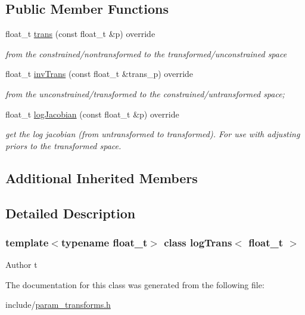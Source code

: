 \subsection*{Public Member Functions}
\begin{DoxyCompactItemize}
\item 
\mbox{\label{classlogTrans_af83380d2e4c27b4311383e3ee164fc8a}} 
float\+\_\+t \hyperlink{classlogTrans_af83380d2e4c27b4311383e3ee164fc8a}{trans} (const float\+\_\+t \&p) override
\begin{DoxyCompactList}\small\item\em from the constrained/nontransformed to the transformed/unconstrained space \end{DoxyCompactList}\item 
\mbox{\label{classlogTrans_a0e8e563da2fb548d7eeced4e1f22e93d}} 
float\+\_\+t \hyperlink{classlogTrans_a0e8e563da2fb548d7eeced4e1f22e93d}{inv\+Trans} (const float\+\_\+t \&trans\+\_\+p) override
\begin{DoxyCompactList}\small\item\em from the unconstrained/transformed to the constrained/untransformed space; \end{DoxyCompactList}\item 
\mbox{\label{classlogTrans_a9b32167fdae993cf790996c0b88e20b6}} 
float\+\_\+t \hyperlink{classlogTrans_a9b32167fdae993cf790996c0b88e20b6}{log\+Jacobian} (const float\+\_\+t \&p) override
\begin{DoxyCompactList}\small\item\em get the log jacobian (from untransformed to transformed). For use with adjusting priors to the transformed space. \end{DoxyCompactList}\end{DoxyCompactItemize}
\subsection*{Additional Inherited Members}


\subsection{Detailed Description}
\subsubsection*{template$<$typename float\+\_\+t$>$\newline
class log\+Trans$<$ float\+\_\+t $>$}

\begin{DoxyAuthor}{Author}
t 
\end{DoxyAuthor}


The documentation for this class was generated from the following file\+:\begin{DoxyCompactItemize}
\item 
include/\hyperlink{param__transforms_8h}{param\+\_\+transforms.\+h}\end{DoxyCompactItemize}
